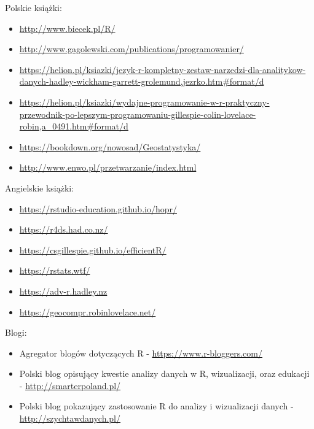 \documentclass[paper=6in:9in,pagesize=pdftex,headinclude=on,footinclude=on,10pt]{scrbook}
\providecommand{\tightlist}{%
  \setlength{\itemsep}{0pt}\setlength{\parskip}{0pt}}
\begin{document}
Polskie książki:

\begin{itemize}
\tightlist
\item
  \url{http://www.biecek.pl/R/} \citep{biecekPrzewodnikPoPakiecie2014}
\item
  \url{http://www.gagolewski.com/publications/programowanier/} \citep{gagolewski2016programowanie}
\item
  \url{https://helion.pl/ksiazki/jezyk-r-kompletny-zestaw-narzedzi-dla-analitykow-danych-hadley-wickham-garrett-grolemund,jezrko.htm\#format/d} \citep{wickham2016r}
\item
  \url{https://helion.pl/ksiazki/wydajne-programowanie-w-r-praktyczny-przewodnik-po-lepszym-programowaniu-gillespie-colin-lovelace-robin,a_0491.htm\#format/d} \citep{gillespie2016efficient}
\item
  \url{https://bookdown.org/nowosad/Geostatystyka/} \citep{nowosadGeostatystyka2019}
\item
  \url{http://www.enwo.pl/przetwarzanie/index.html} \citep{czerneckiMetodyPrzetwarzaniaDanych2018}
\end{itemize}

Angielskie książki:

\begin{itemize}
\tightlist
\item
  \url{https://rstudio-education.github.io/hopr/} \citep{grolemund2014hands}
\item
  \url{https://r4ds.had.co.nz/} \citep{wickham2016r}
\item
  \url{https://csgillespie.github.io/efficientR/} \citep{gillespie2016efficient}
\item
  \url{https://rstats.wtf/} \citep{rstatswtf}
\item
  \url{https://adv-r.hadley.nz} \citep{wickham2014advanced}
\item
  \url{https://geocompr.robinlovelace.net/} \citep{lovelace2019geocomputation}
\end{itemize}

Blogi:

\begin{itemize}
\tightlist
\item
  Agregator blogów dotyczących R - \url{https://www.r-bloggers.com/}
\item
  Polski blog opisujący kwestie analizy danych w R, wizualizacji, oraz edukacji - \url{http://smarterpoland.pl/}
\item
  Polski blog pokazujący zastosowanie R do analizy i wizualizacji danych - \url{http://szychtawdanych.pl/}
\end{itemize}
\end{document}
